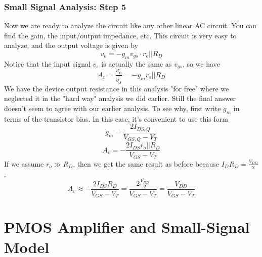 \subsubsection{Small Signal Analysis:  Step 5}
Now we are ready to analyze the circuit like any other linear AC circuit.  You can find the gain, the input/output impedance, etc.  This circuit is very easy to analyze, and the output voltage is given by
    \begin{equation}
        v_o = -g_m v_{gs} \cdot r_o || R_D 
    \end{equation}
Notice that the input signal $v_s$ is actually the same as $v_{gs}$, so we have
    \begin{equation}
        A_v = \frac{v_o}{v_s} = -g_m r_o || R_D
    \end{equation}
We have the device output resistance in this analysis "for free" where we neglected it in the "hard way" analysis we did earlier.   Still the final answer doesn't seem to agree with our earlier analysis.  To see why, first write $g_m$ in terms of the transistor bias.  In this case, it's convenient to use this form
    \begin{equation}
        g_m = \frac{2 I_{DS,Q}}{V_{GS,Q}-V_T}
    \end{equation}
    \begin{equation}
        A_v =  -\frac{2 I_{DS} r_o||R_D}{V_{GS}-V_T}
    \end{equation}
If we assume $r_o \gg R_D$, then we get the same result as before because $I_D R_D = \frac{V_{DD}}{2}$:
    \begin{equation}
        A_v \approx  -\frac{2 I_{DS} R_D}{V_{GS}-V_T} = \frac{2\frac{V_{DD}}{2} }{V_{GS}-V_T} = \frac{V_{DD}}{V_{GS}-V_T}
    \end{equation}
\section{PMOS Amplifier and Small-Signal Model}
